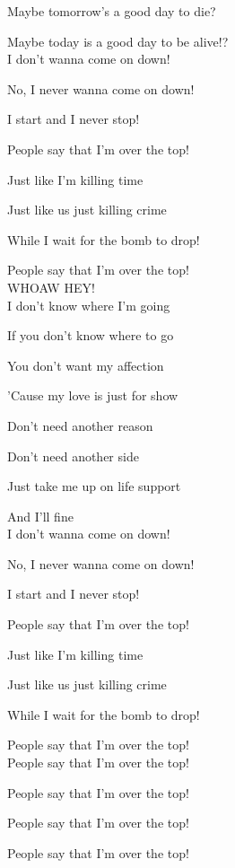 \documentclass{article}
\begin{document}
Maybe tomorrow's a good day to die?

Maybe today is a good day to be alive!?\\

I don't wanna come on down!

No, I never wanna come on down!

I start and I never stop!

People say that I'm over the top!

Just like I'm killing time

Just like us just killing crime

While I wait for the bomb to drop!

People say that I'm over the top!\\

WHOAW HEY!\\

I don't know where I'm going

If you don't know where to go

You don't want my affection

'Cause my love is just for show

Don't need another reason

Don't need another side

Just take me up on life support

And I'll fine\\

I don't wanna come on down!

No, I never wanna come on down!

I start and I never stop!

People say that I'm over the top!

Just like I'm killing time

Just like us just killing crime

While I wait for the bomb to drop!

People say that I'm over the top!\\

People say that I'm over the top!

People say that I'm over the top!

People say that I'm over the top!

People say that I'm over the top!
\end{document}
